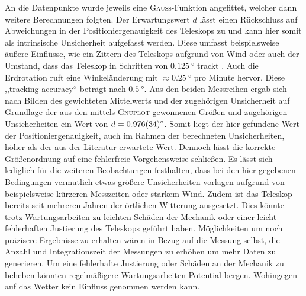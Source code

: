     An die Datenpunkte wurde jeweils eine \textsc{Gauß}-Funktion angefittet, welcher dann weitere Berechnungen folgten.
    Der Erwartungswert $d$ lässt einen Rückschluss auf Abweichungen in der Positioniergenauigkeit des Teleskops zu und kann hier somit als intrinsische Unsicherheit aufgefasst werden.
    Diese umfasst beispielsweise äußere Einflüsse, wie ein Zittern des Teleskops aufgrund von Wind oder auch der Umstand, dass das Teleskop in Schritten von $\SI{0.125}{\degree}$ trackt \cite{Usermanual}. Auch die Erdrotation ruft eine Winkeländerung mit $\approx \SI{0.25}{\degree}$ pro Minute hervor.
    Diese ,,tracking accuracy`` beträgt nach \cite{Usermanual} $\SI{0.5}{\degree}$. 
    Aus den beiden Messreihen ergab sich nach Bilden des gewichteten Mittelwerts und der zugehörigen Unsicherheit auf Grundlage der aus den mittels \textsc{Gnuplot} gewonnenen Größen und zugehörigen Unsicherheiten ein Wert von $d = \SI{0.976 \pm 0.034}{\degree}$.
    Somit liegt der hier gefundene Wert der Positioniergenauigkeit, auch im Rahmen der berechneten Unsicherheiten, höher als der aus der Literatur erwartete Wert. 
    Dennoch lässt die korrekte Größenordnung auf eine fehlerfreie Vorgehensweise schließen.
    Es lässt sich lediglich für die weiteren Beobachtungen festhalten, dass bei den hier gegebenen Bedingungen vermutlich etwas größere Unsicherheiten vorlagen aufgrund von beispielsweise kürzeren Messzeiten oder starkem Wind. 
    Zudem ist das Teleskop bereits seit mehreren Jahren der örtlichen Witterung ausgesetzt.
    Dies könnte trotz Wartungsarbeiten zu leichten Schäden der Mechanik oder einer leicht fehlerhaften Justierung des Teleskops geführt haben.
    Möglichkeiten um noch präzisere Ergebnisse zu erhalten wären in Bezug auf die Messung selbst, die Anzahl und Integrationszeit der Messungen zu erhöhen um mehr Daten zu generieren. Um eine fehlerhafte Justierung oder Schäden an der Mechanik zu beheben könnten regelmäßigere Wartungsarbeiten Potential bergen. Wohingegen auf das Wetter kein Einfluss genommen werden kann.\\ 


